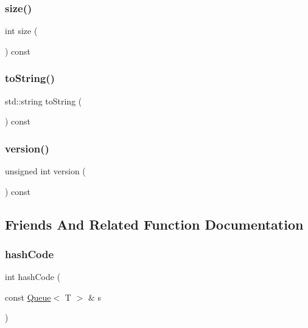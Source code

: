 \mbox{\label{classQueue_af9593d4a5ff4274efaf429cb4f9e57cc}} 
\subsubsection{\texorpdfstring{size()}{size()}}
{\footnotesize\ttfamily int size (\begin{DoxyParamCaption}{ }\end{DoxyParamCaption}) const}

\mbox{\label{classQueue_a1fe5121d6528fdea3f243321b3fa3a49}} 
\subsubsection{\texorpdfstring{to\+String()}{toString()}}
{\footnotesize\ttfamily std\+::string to\+String (\begin{DoxyParamCaption}{ }\end{DoxyParamCaption}) const}

\mbox{\label{classQueue_a0aa696ccb72cbf928535d6b646bac1aa}} 
\subsubsection{\texorpdfstring{version()}{version()}}
{\footnotesize\ttfamily unsigned int version (\begin{DoxyParamCaption}{ }\end{DoxyParamCaption}) const}



\subsection{Friends And Related Function Documentation}
\mbox{\label{classQueue_aacd62c6f29c1e575d1290a1088dd29e1}} 
\subsubsection{\texorpdfstring{hash\+Code}{hashCode}}
{\footnotesize\ttfamily int hash\+Code (\begin{DoxyParamCaption}\item[{const \mbox{\hyperlink{classQueue}{Queue}}$<$ T $>$ \&}]{s }\end{DoxyParamCaption})\hspace{0.3cm}{\ttfamily [friend]}}

